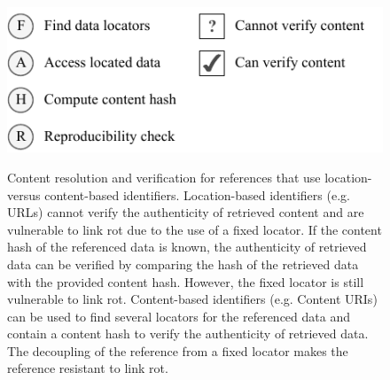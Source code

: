 \begin{figure}[!p] %


\centering
{} \\
 \\
 \\
\includegraphics[scale=.9]{figures-fig4legend_grayscale.pdf}%

\caption{Content resolution and verification for references that use location- versus content-based identifiers.  Location-based identifiers (e.g. URLs) cannot verify the authenticity of retrieved content and are vulnerable to link rot due to the use of a fixed locator.  If the content hash of the referenced data is known, the authenticity of retrieved data can be verified by comparing the hash of the retrieved data with the provided content hash. However, the fixed locator is still vulnerable to link rot.  Content-based identifiers (e.g. Content URIs) can be used to find several locators for the referenced data and contain a content hash to verify the authenticity of retrieved data. The decoupling of the reference from a fixed locator makes the reference resistant to link rot.
}%

\label{fig:verification} %

\end{figure}
